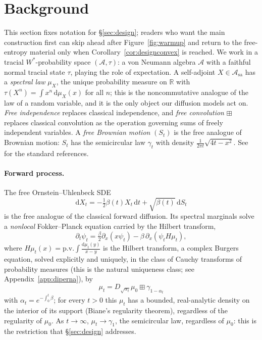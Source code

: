 \documentclass[11pt]{article}
\newcommand{\A}{\mathcal{A}}
\newcommand{\Asa}{\mathcal{A}_{\mathrm{sa}}}
\newcommand{\R}{\mathbb{R}}
\newcommand{\dd}{\mathrm{d}}
\newcommand{\pv}{\mathrm{p.v.}\!}
\theoremstyle{plain}
\theoremstyle{definition}
\theoremstyle{remark}
\begin{document}
\section{Background}\label{sec:background}

This section fixes notation for \S\ref{sec:design}; readers who want the main
construction first can skip ahead after Figure~\ref{fig:warmup} and return to the
free-entropy material only when Corollary~\ref{cor:designconvex} is reached. We work in a tracial
$W^*$-probability space $(\A,\tau)$: a von Neumann algebra $\A$
with a faithful normal tracial state $\tau$, playing the role of expectation. A
self-adjoint $X\in\Asa$ has a \emph{spectral law} $\mu_X$, the unique probability
measure on $\R$ with $\tau(X^n)=\int x^n\,\dd\mu_X(x)$ for all $n$; this is the
noncommutative analogue of the law of a random variable, and it is the only object
our diffusion models act on. \emph{Free independence} replaces classical
independence, and \emph{free convolution} $\boxplus$ replaces classical convolution
as the operation governing sums of freely independent variables. A \emph{free
Brownian motion} $(S_t)$ is the free analogue of Brownian motion: $S_t$ has the
semicircular law $\gamma_t$ with density $\tfrac{1}{2\pi t}\sqrt{4t-x^2}$. See
\citet{VDN1992, NicaSpeicher2006} for the standard references.

\paragraph{Forward process.} The free Ornstein--Uhlenbeck SDE
\begin{equation}\label{eq:ffwd}
  \dd X_t = -\tfrac12\beta(t)X_t\,\dd t + \sqrt{\beta(t)}\,\dd S_t
\end{equation}
is the free analogue of the classical forward diffusion. Its spectral marginals solve
a \emph{nonlocal} Fokker--Planck equation carried by the Hilbert transform,
\begin{equation}\label{eq:ffp}
  \partial_t\psi_t = \tfrac{\beta}{2}\partial_x(x\psi_t) - \beta\,\partial_x(\psi_t
  H\mu_t),
\end{equation}
where $H\mu_t(x)=\pv\!\int\frac{\dd\mu_t(y)}{x-y}$ is the Hilbert transform,
a complex Burgers equation, solved explicitly and uniquely, in the class of Cauchy
transforms of probability measures (this is the natural uniqueness class; see Appendix~\ref{app:diperna}), by
\begin{equation}
\mu_t=D_{\sqrt{\alpha_t}}\mu_0\boxplus\gamma_{1-\alpha_t}
\end{equation}
with $\alpha_t=e^{-\int_0^t\beta}$; for every $t>0$ this $\mu_t$ has a bounded,
real-analytic density on the interior of its support (Biane's regularity theorem),
regardless of the regularity of $\mu_0$. As $t\to\infty$,
$\mu_t\to\gamma_1$, the semicircular law, regardless of $\mu_0$: this is the
restriction that \S\ref{sec:design} addresses.
\end{document}
